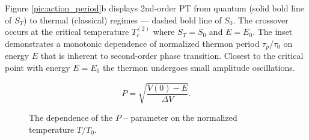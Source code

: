 \documentclass[aps, pre, preprint, groupedaddress, superscriptaddress, showkeys, showpacs] {revtex4-1}
\newcommand{\red}{\color{red}}
\begin{document}
Figure \ref{pic:action_period}b displays 2nd-order PT from quantum (solid bold line of $S_T$) to thermal (classical) regimes --- dashed bold line of $S_0$.
The crossover occurs at the critical temperature $T_{c}^{(2)}$ where $S_T = S_0$ and {$E = E_0$}.
The inset demonstrates a monotonic dependence of normalized thermon period $\tau_p/\tau_0$ on energy $E$ that is inherent to second-order phase transition.
Closest to the critical point with energy $E=E_0$ the thermon undergoes small amplitude oscillations.

{\red
%
\begin{equation}
P = \sqrt{\frac{V(0) - E}{\Delta V}}.
\label{eq:p_parameter}
\end{equation}
%
}

%
\begin{figure}[ht]
\caption
{The dependence of the $P$ -- parameter on the normalized temperature $T/T_{0}$.
\label{pic:temperatures}}
\end{figure}
%
\end{document}
